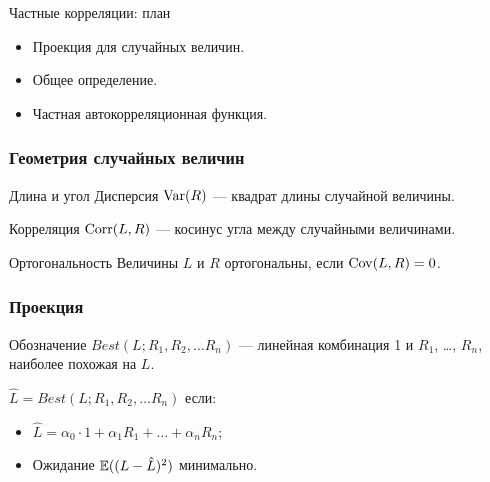 
\begin{frame} %


\end{frame}



\begin{frame}{Частные корреляции: план}
  \begin{itemize}[<+->]
    \item Проекция для случайных величин. 
    \item Общее определение. 
    \item Частная автокорреляционная функция. 
  \end{itemize}

\end{frame}


\begin{frame}
  \frametitle{Геометрия случайных величин}

  \begin{block}{Длина и угол}
    Дисперсия $\operatorname{Var}(R)$ — \alert{квадрат длины} случайной величины.

    Корреляция $\operatorname{Corr}(L, R)$ — \alert{косинус угла} между случайными величинами.
  \end{block}
  \pause
  \begin{block}{Ортогональность}
  Величины $L$ и $R$ \alert{ортогональны}, если $\operatorname{Cov}(L, R) = 0$.     
  \end{block}

\end{frame}

\begin{frame}
  \frametitle{Проекция}

  \begin{block}{Обозначение}
    $Best(L; R_1, R_2, \ldots R_n)$ — линейная комбинация 1 и $R_1$, \ldots, $R_n$, 
    \alert{наиболее} похожая на $L$.
  \end{block}
  \pause
  $\hat L = Best(L; R_1, R_2, \ldots R_n)$ если:
  \begin{itemize}[<+->]
    \item $\hat L = \alpha_0 \cdot 1 + \alpha_1 R_1 + \ldots + \alpha_n R_n$;
    \item Ожидание $\mathbb{E}((L - \hat L)^2)$ минимально. 
  \end{itemize}  
\end{frame}


